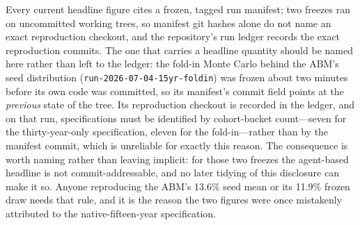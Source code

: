 \documentclass[12pt]{article}
\begin{document}
Every current headline figure cites a frozen, tagged run manifest; two freezes ran on uncommitted working trees, so manifest git hashes alone do not name an exact reproduction checkout, and the repository's run ledger records the exact reproduction commits. The one that carries a headline quantity should be named here rather than left to the ledger: the fold-in Monte Carlo behind the ABM's seed distribution (\texttt{run-2026-07-04-15yr-foldin}) was frozen about two minutes before its own code was committed, so its manifest's commit field points at the \emph{previous} state of the tree. Its reproduction checkout is recorded in the ledger, and on that run, specifications must be identified by cohort-bucket count---seven for the thirty-year-only specification, eleven for the fold-in---rather than by the manifest commit, which is unreliable for exactly this reason. The consequence is worth naming rather than leaving implicit: for those two freezes the agent-based headline is not commit-addressable, and no later tidying of this disclosure can make it so. Anyone reproducing the ABM's 13.6\% seed mean or its 11.9\% frozen draw needs that rule, and it is the reason the two figures were once mistakenly attributed to the native-fifteen-year specification.
\end{document}
